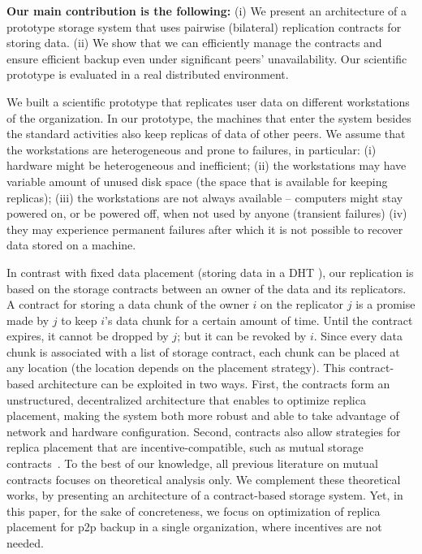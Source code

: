 \documentclass[10pt, final, conference, letterpaper]{IEEEtran}
\begin{document}
\textbf{Our main contribution is the following:} (i) We present an architecture of a prototype storage system that uses pairwise (bilateral) replication contracts for storing data. (ii) We show that we can efficiently manage the contracts and ensure efficient backup
even under significant peers' unavailability. Our scientific prototype is evaluated in a real distributed environment.

We built a scientific prototype that replicates user data on different workstations of the organization. In our prototype, the machines that enter the system besides the standard activities also keep replicas of data of other peers. We assume that the workstations are heterogeneous and prone to failures, in particular: (i) hardware might be heterogeneous and inefficient; (ii) the workstations may have variable amount of unused disk space (the space that is available for keeping replicas); (iii) the workstations are not always available -- computers might stay powered on, or be powered off, when not used by anyone (transient failures) (iv) they may experience permanent failures after which it is not possible to recover data stored on a machine.

In contrast with fixed data placement (storing data in a DHT \cite{ivyP2PFileSystem, pastisP2PFileSystem, igorFs, bitVault, bigTable}), our replication is based on the storage contracts between an owner of the data and its replicators. A contract for storing a data chunk of the owner $i$ on the replicator $j$ is a promise made by $j$ to keep $i$'s data chunk for a certain amount of time. Until the contract expires, it cannot be dropped by $j$; but it can be revoked by $i$. Since every data chunk is associated with a list of storage contract, each chunk can be placed at any location (the location depends on the placement strategy). This contract-based architecture can be exploited in two ways. First, the contracts form an unstructured, decentralized architecture that enables to optimize replica placement, making the system both more robust and able to take advantage of network and hardware configuration.
Second, contracts also allow strategies for replica placement that are incentive-compatible, such as mutual storage contracts~\cite{Rzadca2010ReplicaPlacementin, cox2003samsara}. To the best of our knowledge, all previous literature on mutual contracts focuses on theoretical analysis only. We complement these theoretical works, by presenting an architecture of a contract-based storage system. Yet, in this paper, for the sake of concreteness, we focus on optimization of replica placement for p2p backup in a single organization, where incentives are not needed.
\end{document}
